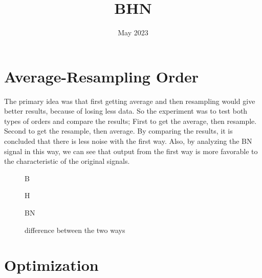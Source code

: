 \documentclass{article}
\title{BHN}
\date{May 2023}
\begin{document}
\maketitle

\section{Average-Resampling Order}

The primary idea was that first getting average and then resampling would give better results, because of losing less data. So the experiment was to test both types of orders and compare the results; First to get the average, then resample. Second to get the resample, then average.
By comparing the results, it is concluded that there is less noise with the first way. Also, by analyzing the BN signal in this way, we can see that output from the first way is more favorable to the characteristic of the original signals.

\bigskip
\begin{figure}[H]
\centering

\caption{B}
\end{figure}

\begin{figure}[H]
\centering

\caption{H}
\end{figure}

\begin{figure}[H]
\centering

\caption{BN}
\end{figure}

\begin{figure}[H]
\centering

\caption{difference between the two ways}
\end{figure}

\bigskip
\section{Optimization}
\end{document}

